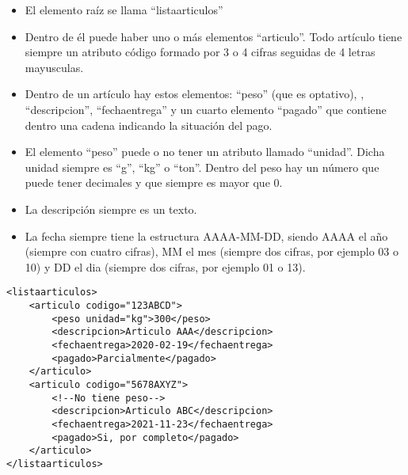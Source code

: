\documentclass{examen}
\begin{document}

\begin{itemize}
\item{    El elemento raíz se llama ``listaarticulos''}
\item{    Dentro de él puede haber uno o más elementos ``articulo''. Todo artículo tiene siempre un atributo código formado por 3 o 4 cifras seguidas de 4 letras mayusculas.}
\item{  Dentro de un artículo hay estos elementos: ``peso'' (que es optativo), , ``descripcion'', ``fechaentrega'' y un cuarto elemento ``pagado'' que contiene dentro una cadena indicando la situación del pago.}
\item{   El elemento ``peso'' puede o no tener un atributo llamado ``unidad''. Dicha unidad siempre es ``g'', ``kg'' o ``ton''. Dentro del peso hay un número que puede tener decimales y que siempre es mayor que 0.}
\item{La descripción siempre es un texto.}
\item{La fecha siempre tiene la estructura AAAA-MM-DD, siendo AAAA el año (siempre con cuatro cifras), MM el mes (siempre dos cifras, por ejemplo 03 o 10) y DD el dia (siempre dos cifras, por ejemplo 01 o 13).}

\end{itemize}

\break




\begin{verbatim}
<listaarticulos>
    <articulo codigo="123ABCD">
        <peso unidad="kg">300</peso>
        <descripcion>Articulo AAA</descripcion>
        <fechaentrega>2020-02-19</fechaentrega>
        <pagado>Parcialmente</pagado>
    </articulo>
    <articulo codigo="5678AXYZ">
        <!--No tiene peso-->
        <descripcion>Articulo ABC</descripcion>
        <fechaentrega>2021-11-23</fechaentrega>
        <pagado>Si, por completo</pagado>
    </articulo>
</listaarticulos>
\end{verbatim}
\end{document}
